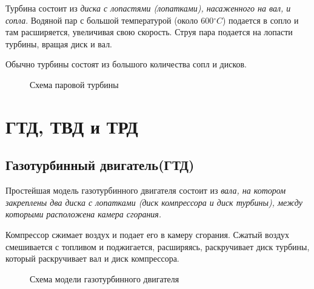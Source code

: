 \documentclass[a4paper,14pt]{article}
\begin{document}
        Турбина состоит из \textit{диска с лопастями (лопатками), насаженного на вал, и сопла}. Водяной пар с большой температурой (около 600$^{\circ}C$) подается в сопло и там расширяется, увеличивая свою скорость. Струя пара подается на лопасти турбины, вращая диск и вал.

        Обычно турбины состоят из большого количества сопл и дисков.
        \begin{figure}[h]
            \caption{Схема паровой турбины}
        \end{figure}
        
    \pagebreak
    \section{ГТД, ТВД и ТРД}
    \subsection{Газотурбинный двигатель(ГТД)}
        Простейшая модель газотурбинного двигателя состоит из \textit{вала, на котором закреплены два диска с лопатками (диск компрессора и диск турбины), между которыми расположена камера сгорания.}

        Компрессор сжимает воздух и подает его в камеру сгорания. Сжатый воздух смешивается с топливом и поджигается, расширяясь, раскручивает диск турбины, который раскручивает вал и диск компрессора.
        \begin{figure}[h]
            \caption{Схема модели газотурбинного двигателя}
        \end{figure}
\end{document}

